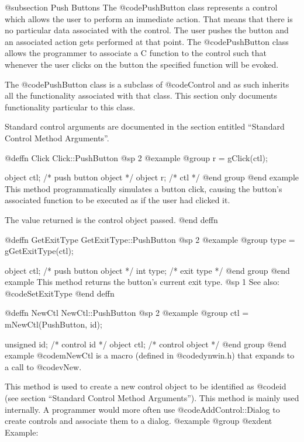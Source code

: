 {@subsection Push Buttons
The @code{PushButton} class represents a control which allows the user
to perform an immediate action.  That means that there is no particular
data associated with the control.  The user pushes the button and an
associated action gets performed at that point.  The @code{PushButton}
class allows the programmer to associate a C function to the control
such that whenever the user clicks on the button the specified function
will be evoked.

The @code{PushButton} class is a subclass of @code{Control} and as such
inherits all the functionality associated with that class.  This section
only documents functionality particular to this class.

Standard control arguments are documented in the section entitled
``Standard Control Method Arguments''.





@deffn {Click} Click::PushButton
@sp 2
@example
@group
r = gClick(ctl);

object  ctl;   /*  push button object  */
object  r;     /*  ctl                 */
@end group
@end example
This method programmatically simulates a button click, causing the
button's associated function to be executed as if the user had
clicked it.

The value returned is the control object passed.
@end deffn



@deffn {GetExitType} GetExitType::PushButton
@sp 2
@example
@group
type = gGetExitType(ctl);

object  ctl;    /*  push button object  */
int     type;   /*  exit type           */
@end group
@end example
This method returns the button's current exit type.
@sp 1
See also:  @code{SetExitType}
@end deffn



@deffn {NewCtl} NewCtl::PushButton
@sp 2
@example
@group
ctl = mNewCtl(PushButton, id);

unsigned  id;   /*  control id      */
object   ctl;   /*  control object  */
@end group
@end example
@code{mNewCtl} is a macro (defined in @code{dynwin.h}) that expands to
a call to @code{vNew}.

This method is used to create a new control object to be identified as
@code{id} (see section ``Standard Control Method Arguments'').  This
method is mainly used internally.  A programmer would more often
use @code{AddControl::Dialog} to create controls and associate them
to a dialog.
@example
@group
@exdent Example:

}
